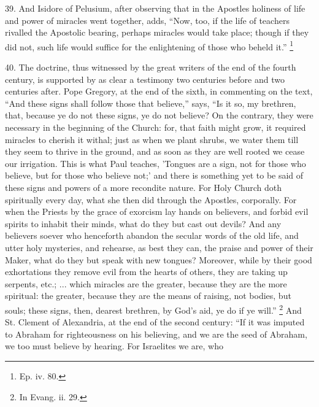 39.
And Isidore of Pelusium, after observing that in the Apostles holiness
of life and power of miracles went together, adds, ``Now, too, if the
life of teachers rivalled the Apostolic bearing, perhaps miracles
would take place; though if they did not, such life would suffice for
the enlightening of those who beheld it.'' \footnote{Ep. iv. 80.}

40.
The doctrine, thus witnessed by the great writers of the end of the
fourth century, is supported by as clear a testimony two centuries
before and two centuries after. Pope Gregory, at the end of the sixth,
in commenting on the text, ``And these signs shall follow those that
believe,'' says, ``Is it so, my brethren, that, because ye do not these
signs, ye do not believe? On the contrary, they were necessary in the
beginning of the Church: for, that faith might grow, it required
miracles to cherish it withal; just as when we plant shrubs, we water
them till they seem to thrive in the ground, and as soon as they are
well rooted we cease our irrigation. This is what Paul teaches,
'Tongues are a sign, not for those who believe, but for those who
believe not;' and there is something yet to be said of these signs and
powers of a more recondite nature. For Holy Church doth spiritually
every day, what she then did through the Apostles, corporally. For
when the Priests by the grace of exorcism lay hands on believers, and
forbid evil spirits to inhabit their minds, what do they but
cast out devils? And any believers soever who henceforth abandon the
secular words of the old life, and utter holy mysteries, and rehearse,
as best they can, the praise and power of their Maker, what do they
but speak with new tongues? Moreover, while by their good exhortations
they remove evil from the hearts of others, they are taking up
serpents, etc.; ... which miracles are the greater, because they are
the more spiritual: the greater, because they are the means of
raising, not bodies, but souls; these signs, then, dearest brethren,
by God's aid, ye do if ye will.'' \footnote{In Evang. ii. 29.} And St. Clement of
Alexandria, at the end of the second century: ``If it was imputed to
Abraham for righteousness on his believing, and we are the seed of
Abraham, we too must believe by hearing. For Israelites we are, who
